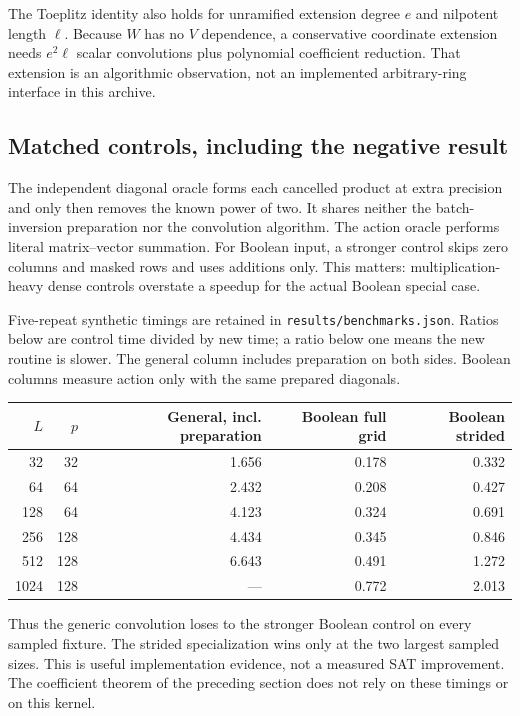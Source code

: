 The Toeplitz identity also holds for unramified extension degree $e$ and
nilpotent length $\ell$. Because $W$ has no $V$ dependence, a conservative
coordinate extension needs $e^2\ell$ scalar convolutions plus polynomial
coefficient reduction. That extension is an algorithmic observation, not
an implemented arbitrary-ring interface in this archive.

\subsection{Matched controls, including the negative result}
The independent diagonal oracle forms each cancelled product at extra
precision and only then removes the known power of two. It shares neither
the batch-inversion preparation nor the convolution algorithm. The action
oracle performs literal matrix--vector summation. For Boolean input, a
stronger control skips zero columns and masked rows and uses additions
only. This matters: multiplication-heavy dense controls overstate a speedup
for the actual Boolean special case.

Five-repeat synthetic timings are retained in
\texttt{results/benchmarks.json}. Ratios below are control time divided by
new time; a ratio below one means the new routine is slower. The general
column includes preparation on both sides. Boolean columns measure action
only with the same prepared diagonals.
\begin{center}\small
\begin{tabular}{rr rrr}
\toprule $L$ & $p$ & General, incl. preparation & Boolean full grid & Boolean strided\\\midrule
32&32&1.656&0.178&0.332\\
64&64&2.432&0.208&0.427\\
128&64&4.123&0.324&0.691\\
256&128&4.434&0.345&0.846\\
512&128&6.643&0.491&1.272\\
1024&128&---&0.772&2.013\\
\bottomrule
\end{tabular}
\end{center}
Thus the generic convolution loses to the stronger Boolean control on
every sampled fixture. The strided specialization wins only at the two
largest sampled sizes. This is useful implementation evidence, not a
measured SAT improvement. The coefficient theorem of the preceding section
does not rely on these timings or on this kernel.
